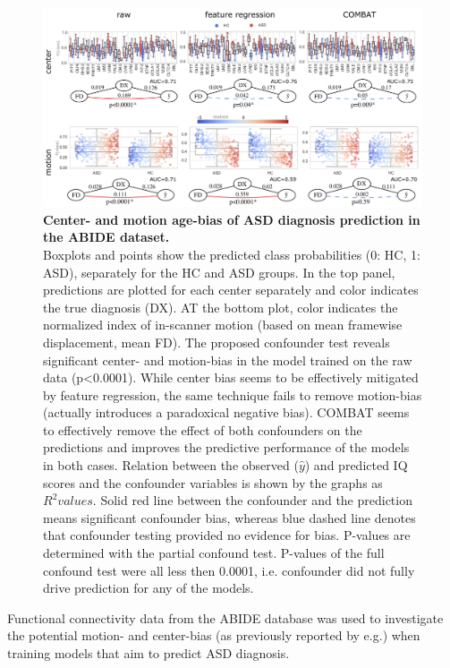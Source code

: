 \documentclass{article}
\begin{document}
\begin{figure}[!b]
  \centering
  \includegraphics[width=0.75\paperwidth]{fig/fig_abide.png}
  \caption{\textbf{Center- and motion age-bias of ASD diagnosis prediction in the ABIDE dataset.} \\
  Boxplots and points show the predicted class probabilities (0: HC, 1: ASD), separately for the HC and ASD groups. In the top panel, predictions are plotted for each center separately and color indicates the true diagnosis (DX). AT the bottom plot, color indicates the normalized index of in-scanner motion (based on mean framewise displacement, mean FD). The proposed confounder test reveals significant center- and motion-bias in the model trained on the raw data (p<0.0001). While center bias seems to be effectively mitigated by feature regression, the same technique fails to remove motion-bias (actually introduces a paradoxical negative bias). COMBAT seems to effectively remove the effect of both confounders on the predictions and improves the predictive performance of the models in both cases.
  Relation between the observed ($\hat{y}$) and predicted IQ scores and the confounder variables is shown by the graphs as $R^2 values$. Solid red line between the confounder and the prediction means significant confounder bias, whereas blue dashed line denotes that confounder testing provided no evidence for bias. P-values are determined with the partial confound test. P-values of the full confound test were all less then 0.0001, i.e. confounder did not fully drive prediction for any of the models.
  }
  \label{fig:abide}
\end{figure}

Functional connectivity data from the ABIDE\citep{di2014autism} database was used to investigate the potential motion- and center-bias (as previously reported by e.g.\cite{spisak2014voxel, spisak2019optimal, gotts2013perils}) when training models that aim to predict ASD diagnosis.
\end{document}
